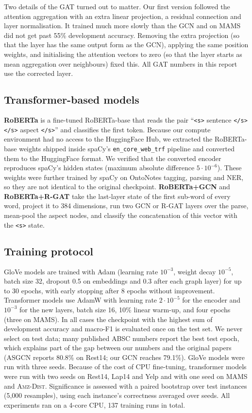 \documentclass[11pt]{article}
\newcommand{\dist}{\textsc{Amz-Dist}}
\begin{document}
Two details of the GAT turned out to matter. Our first version followed the attention aggregation with an extra linear projection, a residual connection and layer normalisation. It trained much more slowly than the GCN and on MAMS did not get past 55\% development accuracy. Removing the extra projection (so that the layer has the same output form as the GCN), applying the same position weights, and initialising the attention vectors to zero (so that the layer starts as mean aggregation over neighbours) fixed this. All GAT numbers in this report use the corrected layer.

\subsection{Transformer-based models}
\textbf{RoBERTa} is a fine-tuned RoBERTa-base \citep{liu2019roberta} that reads the pair ``\texttt{<s>} sentence \texttt{</s></s>} aspect \texttt{</s>}'' and classifies the first token. Because our compute environment had no access to the HuggingFace Hub, we extracted the RoBERTa-base weights shipped inside spaCy's \texttt{en\_core\_web\_trf} pipeline and converted them to the HuggingFace format. We verified that the converted encoder reproduces spaCy's hidden states (maximum absolute difference $5 \cdot 10^{-6}$). These weights were further trained by spaCy on OntoNotes tagging, parsing and NER, so they are not identical to the original checkpoint.
\textbf{RoBERTa+GCN} and \textbf{RoBERTa+R-GAT} take the last-layer state of the first sub-word of every word, project it to 384 dimensions, run two GCN or R-GAT layers over the parse, mean-pool the aspect nodes, and classify the concatenation of this vector with the \texttt{<s>} state.

\subsection{Training protocol}
GloVe models are trained with Adam (learning rate $10^{-3}$, weight decay $10^{-5}$, batch size 32, dropout 0.5 on embeddings and 0.3 after each graph layer) for up to 30 epochs, with early stopping after 8 epochs without improvement. Transformer models use AdamW \citep{loshchilov2019decoupled} with learning rate $2 \cdot 10^{-5}$ for the encoder and $10^{-3}$ for the new layers, batch size 16, 10\% linear warm-up, and four epochs (three on MAMS). In all cases the checkpoint with the highest sum of development accuracy and macro-F1 is evaluated once on the test set. We never select on test data; many published ABSC numbers report the best test epoch, which explains part of the gap between our numbers and the original papers (ASGCN reports 80.8\% on Rest14; our GCN reaches 79.1\%). GloVe models were run with three seeds. Because of the cost of CPU fine-tuning, transformer models were run with two seeds on Rest14, Lap14 and Yelp and with one seed on MAMS and \dist. Significance is assessed with a paired bootstrap over test instances \citep{berg-kirkpatrick-etal-2012-empirical} (5,000 resamples), using each instance's correctness averaged over seeds. All experiments ran on a 4-core CPU, 137 training runs in total.
\end{document}

